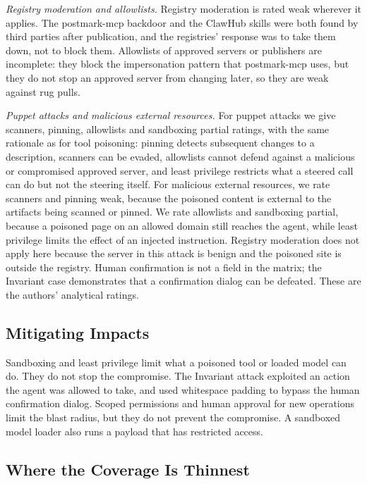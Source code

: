 \documentclass[conference]{IEEEtran}
\begin{document}
\emph{Registry moderation and allowlists.} Registry moderation is rated weak wherever it applies. The postmark-mcp backdoor and the ClawHub skills were both found by third parties after publication, and the registries' response was to take them down, not to block them. Allowlists of approved servers or publishers are incomplete: they block the impersonation pattern that postmark-mcp uses, but they do not stop an approved server from changing later, so they are weak against rug pulls.

\emph{Puppet attacks and malicious external resources.} For puppet attacks we give scanners, pinning, allowlists and sandboxing partial ratings, with the same rationale as for tool poisoning: pinning detects subsequent changes to a description, scanners can be evaded, allowlists cannot defend against a malicious or compromised approved server, and least privilege restricts what a steered call can do but not the steering itself. For malicious external resources, we rate scanners and pinning weak, because the poisoned content is external to the artifacts being scanned or pinned. We rate allowlists and sandboxing partial, because a poisoned page on an allowed domain still reaches the agent, while least privilege limits the effect of an injected instruction. Registry moderation does not apply here because the server in this attack is benign and the poisoned site is outside the registry. Human confirmation is not a field in the matrix; the Invariant case demonstrates that a confirmation dialog can be defeated. These are the authors' analytical ratings.

\subsection{Mitigating Impacts}
\label{sec:define-impact}

Sandboxing and least privilege limit what a poisoned tool or loaded model can do. They do not stop the compromise. The Invariant attack exploited an action the agent was allowed to take, and used whitespace padding to bypass the human confirmation dialog. Scoped permissions and human approval for new operations limit the blast radius, but they do not prevent the compromise. A sandboxed model loader also runs a payload that has restricted access.

\subsection{Where the Coverage Is Thinnest}
\label{section:def-thin}
\end{document}

